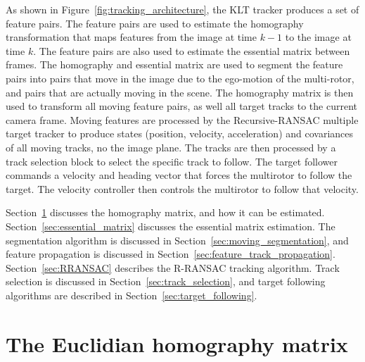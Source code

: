 As shown in Figure~\ref{fig:tracking_architecture}, the KLT tracker produces a set of feature pairs.  The feature pairs are used to estimate the homography transformation that maps features from the image at time $k-1$ to the image at time $k$.  The feature pairs are also used to estimate the essential matrix between frames.  The homography and essential matrix are used to segment the feature pairs into pairs that move in the image due to the ego-motion of the multi-rotor, and pairs that are actually moving in the scene.  The homography matrix is then used to transform all moving feature pairs, as well all target tracks to the current camera frame.  Moving features are processed by the Recursive-RANSAC multiple target tracker to produce states (position, velocity, acceleration) and covariances of all moving tracks, no the image plane.  The tracks are then processed by a track selection block to select the specific track to follow.  The target follower commands a velocity and heading vector that forces the multirotor to follow the target.  The velocity controller then controls the multirotor to follow that velocity.

Section~\ref{sec:homography_matrix} discusses the homography matrix, and how it can be estimated. Section~\ref{sec:essential_matrix} discusses the essential matrix estimation.
The segmentation algorithm is discussed in Section~\ref{sec:moving_segmentation}, and feature propagation is discussed in Section~\ref{sec:feature_track_propagation}.
Section~\ref{sec:RRANSAC} describes the R-RANSAC tracking algorithm.  Track selection is discussed in Section~\ref{sec:track_selection}, and target following algorithms are described in Section~\ref{sec:target_following}.

\section{The Euclidian homography matrix}
\label{sec:homography_matrix}


